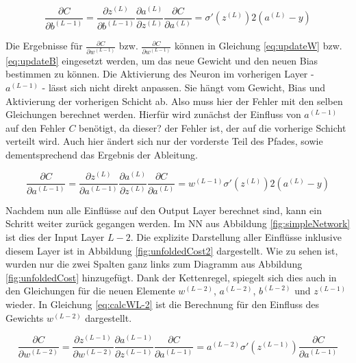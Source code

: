 \begin{equation}
    \frac{\partial C }{\partial b^{(L-1)}} =  
    \frac{\partial z^{(L)} }{\partial b^{(L-1)}}
    \frac{\partial a^{(L)} }{\partial z^{(L)}}
    \frac{\partial C }{\partial a^{(L)}} =  \sigma'(z^{(L)})
    2(a^{(L)}-y)
\end{equation}

Die Ergebnisse für $\frac{\partial C }{\partial w^{(L-1)}}$  bzw. $\frac{\partial C }{\partial w^{(L-1)}}$ können in Gleichung \ref{eq:updateW} bzw. \ref{eq:updateB} eingesetzt werden, um das neue Gewicht und den neuen Bias bestimmen zu können. Die Aktivierung des Neuron im vorherigen Layer - $a^{(L-1)}$ - lässt sich nicht direkt anpassen. Sie hängt vom Gewicht, Bias und Aktivierung der vorherigen Schicht ab. Also muss hier der Fehler mit den selben Gleichungen berechnet werden. Hierfür wird zunächst der Einfluss von $a^{(L-1)}$ auf den Fehler $C$ benötigt, da dieser? der Fehler ist, der auf die vorherige Schicht verteilt wird. Auch hier ändert sich nur der vorderste Teil des Pfades, sowie dementsprechend das Ergebnis der Ableitung.

\begin{equation} \label{eq:partialCpartialaL-1}
    \frac{\partial C }{\partial a^{(L-1)}} =  
    \frac{\partial z^{(L)} }{\partial a^{(L-1)}}
    \frac{\partial a^{(L)} }{\partial z^{(L)}}
    \frac{\partial C }{\partial a^{(L)}} = w^{(L-1)}\sigma'(z^{(L)})
    2(a^{(L)}-y)
\end{equation}

Nachdem nun alle Einflüsse auf den Output Layer berechnet sind, kann ein Schritt weiter zurück gegangen werden. Im \ac{NN} aus Abbildung \ref{fig:simpleNetwork} ist dies der Input Layer $L-2$. Die explizite Darstellung aller Einflüsse inklusive diesem Layer ist in Abbildung \ref{fig:unfoldedCost2} dargestellt. Wie zu sehen ist, wurden nur die zwei Spalten ganz links zum Diagramm aus Abbildung \ref{fig:unfoldedCost} hinzugefügt. Dank der Kettenregel, spiegelt sich dies auch in den Gleichungen für die neuen Elemente $w^{(L-2)}$, $a^{(L-2)}$, $b^{(L-2)}$ und $z^{(L-1)}$ wieder. In Gleichung \ref{eq:calcWL-2} ist die Berechnung für den Einfluss des Gewichts $w^{(L-2)}$ dargestellt.

\begin{equation} \label{eq:calcWL-2}
    \frac{\partial C }{\partial w^{(L-2)}} = 
    \frac{\partial z^{(L-1)} }{\partial w^{(L-2)}}
    \frac{\partial a^{(L-1)} }{\partial z^{(L-1)}}
    \frac{\partial C }{\partial a^{(L-1)}} = 
    a^{(L-2)}\sigma'(z^{(L-1)}) \frac{\partial C}{\partial a^{(L-1)}}
\end{equation}

